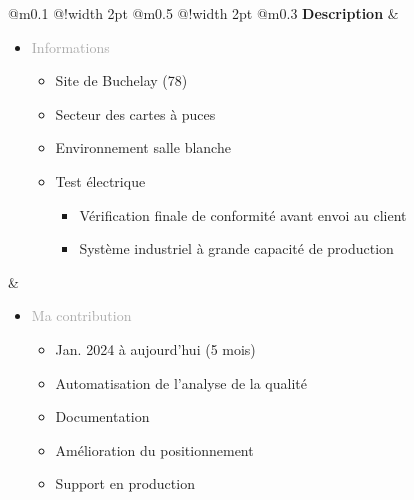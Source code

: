 \documentclass{article}
\begin{document}
\begin{tabular}
    {
        @{}m{}
        @{\hspace{0.001\textwidth}}!{\color{secondaryBlue}\vline width 2pt}
        @{}m{0.5\textwidth}
        @{\hspace{0.025\textwidth}}!{\color{secondaryBlue}\vline width 2pt}
        @{}m{0.3\textwidth}
    }
    \textcolor{secondaryBlue}{\textbf{Description}}           
    &
    \begin{itemize}[label={}, topsep=8pt, partopsep=0pt, itemsep=0.5pt, parsep=2pt, after=\vspace*{-\baselineskip}]
        \setlength{\itemsep}{10pt} 
        \item \textcolor{darkGray}{Informations}
        \begin{itemize}[label={\textcolor{gray!100}{\checkmark}}, topsep=8pt, partopsep=0pt, itemsep=0.5pt, parsep=2pt] 
            \item \textcolor{gray!100}{Site de Buchelay (78)}
            \item \textcolor{gray!100}{Secteur des cartes à puces}
            \item \textcolor{gray!100}{Environnement salle blanche}
            \item \textcolor{gray!100}{Test électrique}
            \begin{itemize}
                [label={\textcolor{gray!100}{$\triangleright$}}, topsep=0pt, partopsep=0pt, itemsep=0.5pt, parsep=2pt] 
                \item \textcolor{gray!100}{Vérification finale de conformité avant envoi au client}
                \item \textcolor{gray!100}{Système industriel à grande capacité de production}
            \end{itemize}
        \end{itemize}
    \end{itemize}
    &
    \begin{itemize}[label={}, topsep=8pt, partopsep=0pt, itemsep=0.5pt, parsep=2pt, after=\vspace*{-\baselineskip}]
        \setlength{\itemsep}{10pt} 
        \item \textcolor{darkGray}{Ma contribution}
        \begin{itemize}[label={\textcolor{gray!100}{\checkmark}}, topsep=8pt, partopsep=0pt, itemsep=0.5pt, parsep=2pt] 
            \item \textcolor{gray!100}{Jan. 2024 à aujourd'hui (5 mois)}
            \item \textcolor{gray!100}{Automatisation de l'analyse de la qualité}
            \item \textcolor{gray!100}{Documentation}
            \item \textcolor{gray!100}{Amélioration du positionnement}
            \item \textcolor{gray!100}{Support en production}
        \end{itemize}
    \end{itemize}
\end{tabular}
\end{document}

